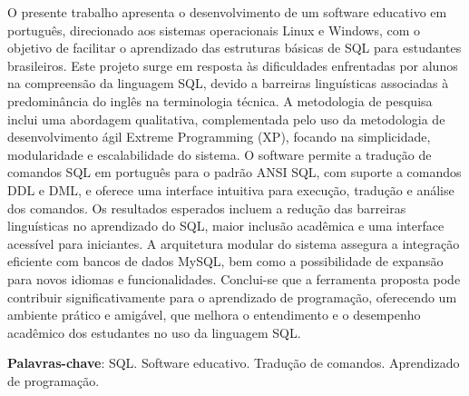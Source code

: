 \begin{resumo}
    O presente trabalho apresenta o desenvolvimento de um software educativo em português, direcionado aos sistemas operacionais Linux e Windows, com o objetivo de facilitar o aprendizado das estruturas básicas de SQL para estudantes brasileiros. Este projeto surge em resposta às dificuldades enfrentadas por alunos na compreensão da linguagem SQL, devido a barreiras linguísticas associadas à predominância do inglês na terminologia técnica. A metodologia de pesquisa inclui uma abordagem qualitativa, complementada pelo uso da metodologia de desenvolvimento ágil Extreme Programming (XP), focando na simplicidade, modularidade e escalabilidade do sistema. O software permite a tradução de comandos SQL em português para o padrão ANSI SQL, com suporte a comandos DDL e DML, e oferece uma interface intuitiva para execução, tradução e análise dos comandos. Os resultados esperados incluem a redução das barreiras linguísticas no aprendizado do SQL, maior inclusão acadêmica e uma interface acessível para iniciantes. A arquitetura modular do sistema assegura a integração eficiente com bancos de dados MySQL, bem como a possibilidade de expansão para novos idiomas e funcionalidades. Conclui-se que a ferramenta proposta pode contribuir significativamente para o aprendizado de programação, oferecendo um ambiente prático e amigável, que melhora o entendimento e o desempenho acadêmico dos estudantes no uso da linguagem SQL.
    
    \vspace{\onelineskip}
    
    \noindent
    \textbf{Palavras-chave}: SQL. Software educativo. Tradução de comandos. Aprendizado de programação.
    \end{resumo}
